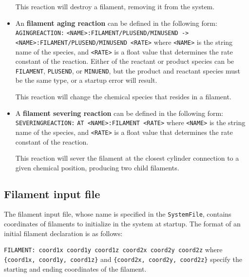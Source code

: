 \documentclass[11pt, oneside]{article}   	%
\begin{document}
\begin{itemize}
This reaction will destroy a filament, removing it from the system.

\item An \textbf{filament aging reaction} can be defined in the following form:\newline\newline
\texttt{AGINGREACTION:}\newline
\texttt{<NAME>:FILAMENT/PLUSEND/MINUSEND ->}\newline
\texttt{<NAME>:FILAMENT/PLUSEND/MINUSEND <RATE>}\newline\newline
where \texttt{<NAME>} is the string name of the species, and \texttt{<RATE>} is a float value that determines the rate constant of the reaction. Either of the reactant or product species can be \texttt{FILAMENT}, \texttt{PLUSEND}, or \texttt{MINUEND}, but the product and reactant species must be the same type, or a startup error will result.

This reaction will change the chemical species that resides in a filament.

\item A \textbf{filament severing reaction} can be defined in the following form:\newline\newline
\texttt{SEVERINGREACTION:}\newline
\texttt{AT <NAME>:FILAMENT <RATE>}\newline\newline
where \texttt{<NAME>} is the string name of the species, and \texttt{<RATE>} is a float value that determines the rate constant of the reaction.

This reaction will sever the filament at the closest cylinder connection to a given chemical position, producing two child filaments.

\end{itemize}

\subsection{Filament input file}

The filament input file, whose name is specified in the \texttt{SystemFile}, contains coordinates of filaments to initialize in the system at startup. The format of an initial filament declaration is as follows:\newline

\texttt{FILAMENT: coord1x coord1y coord1z coord2x coord2y coord2z}\newline\newline
\noindent where \texttt{\{coord1x, coord1y, coord1z\}} and \texttt{\{coord2x, coord2y, coord2z\}} specify the starting and 
ending coordinates of the filament.
\end{document}
